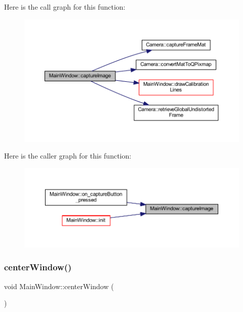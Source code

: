 Here is the call graph for this function\+:
\nopagebreak
\begin{figure}[H]
\begin{center}
\leavevmode
\includegraphics[width=350pt]{classMainWindow_a22df50c440a9aa974654f787d5935761_cgraph}
\end{center}
\end{figure}
Here is the caller graph for this function\+:
\nopagebreak
\begin{figure}[H]
\begin{center}
\leavevmode
\includegraphics[width=350pt]{classMainWindow_a22df50c440a9aa974654f787d5935761_icgraph}
\end{center}
\end{figure}
\mbox{\label{classMainWindow_a775d79cb8170d36faf4aa9ce4570d8b3}} 
\subsubsection{\texorpdfstring{centerWindow()}{centerWindow()}}
{\footnotesize\ttfamily void Main\+Window\+::center\+Window (\begin{DoxyParamCaption}{ }\end{DoxyParamCaption})\hspace{0.3cm}{\ttfamily [private]}}



